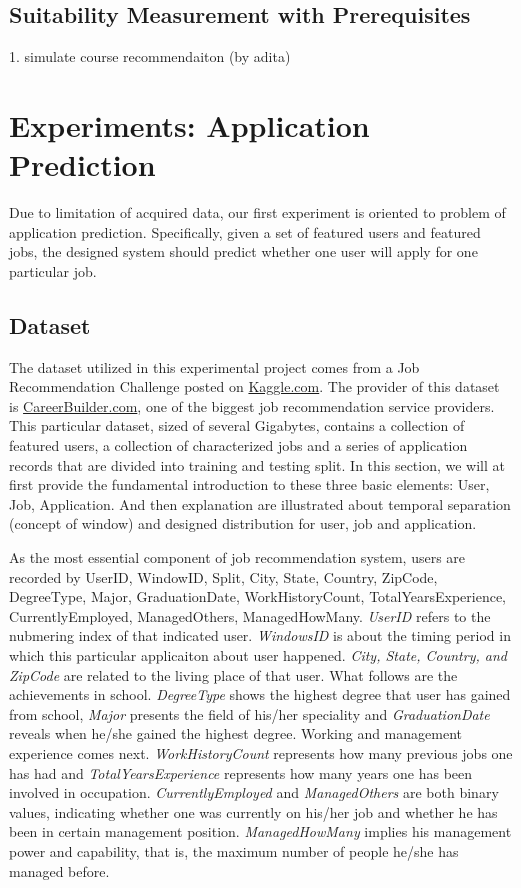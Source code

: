\documentclass{article} %
\begin{document}
\subsection{Suitability Measurement with Prerequisites}
1. simulate course recommendaiton (by adita)

\section{Experiments: Application Prediction}
Due to limitation of acquired data, our first experiment is oriented to
problem of application prediction. Specifically, given a set of featured users
and featured jobs, the designed system should predict whether one user will
apply for one particular job.

\subsection{Dataset}
The dataset utilized in this experimental project comes from a Job
Recommendation Challenge posted on
\href{http://www.kaggle.com/c/job-recommendation/data}{Kaggle.com}. The
provider of this dataset is
\href{http://www.careerbuilder.com/}{CareerBuilder.com}, one of the biggest
job recommendation service providers. This particular dataset, sized of several
Gigabytes, contains a collection of featured users, a collection of
characterized jobs and a series of application records that are divided into
training and testing split.  In this section, we will at first provide the
fundamental introduction to these three basic elements: User, Job,
Application. And then explanation are illustrated about temporal separation (concept of
window) and designed distribution for user, job and application. 

As the most essential component of job recommendation system, users are
recorded by UserID, WindowID, Split, City, State, Country, ZipCode,
DegreeType, Major, GraduationDate, WorkHistoryCount,
TotalYearsExperience, CurrentlyEmployed, ManagedOthers, ManagedHowMany.
{\it UserID} refers to the nubmering index of that indicated user.  
{\it WindowsID} is about the timing period in which this particular
applicaiton about user happened. 
{\it City, State, Country, and ZipCode} are related to the living place of
that user. 
What follows are the achievements in school. 
{\it DegreeType} shows the highest degree that user has gained from school,
{\it Major} presents the field of his/her speciality and 
{\it GraduationDate} reveals when he/she gained the highest degree.
Working and management experience comes next.
{\it WorkHistoryCount} represents how many previous jobs one has had and
{\it TotalYearsExperience} represents how many years one has been involved in
occupation. 
{\it CurrentlyEmployed} and {\it ManagedOthers} are both binary values,
indicating whether one was currently on his/her job and whether he has been in
certain management position. 
{\it ManagedHowMany} implies his management power and capability, that is, the maximum number
of people he/she has managed before.
\end{document}

